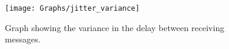 \begin{figure}[p]
  \centering
  \texttt{[image: Graphs/jitter\_variance]}
  \caption{Graph showing the variance in the delay between receiving messages.}
  \label{fig:jitter_variance}
\end{figure}
